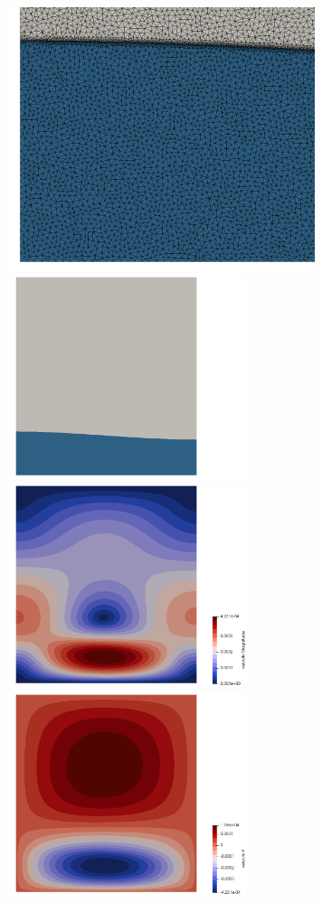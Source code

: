 \begin{center}
\includegraphics[width=9cm]{python_codes/fieldstone_93/results_exp4/grid_zoom}\\
\includegraphics[width=7cm]{python_codes/fieldstone_93/results_exp4/grid}
\includegraphics[width=7cm]{python_codes/fieldstone_93/results_exp4/vel}\\
\includegraphics[width=7cm]{python_codes/fieldstone_93/results_exp4/u}

\end{center}
